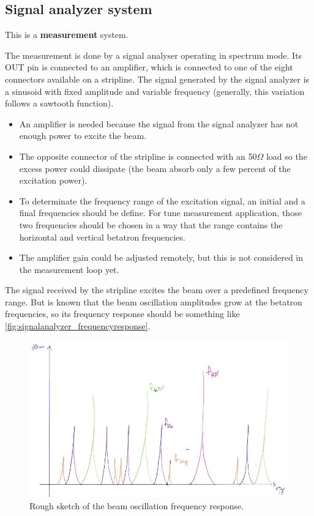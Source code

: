 \subsection{Signal analyzer system}
This is a \textbf{measurement} system.

The measurement is done by a signal analyser operating in spectrum mode. Its OUT pin is connected to an amplifier, which is connected to one of the eight connectors available on a stripline. The signal generated by the signal analyzer is a sinusoid with fixed amplitude and variable frequency (generally, this variation follows a sawtooth function).

\begin{itemize}
	\item An amplifier is needed because the signal from the signal analyzer has not enough power to excite the beam.
	\item The opposite connector of the stripline is connected with an 50$\Omega$ load so the excess power could dissipate (the beam absorb only a few percent of the excitation power).
	\item To determinate the frequency range of the excitation signal, an initial and a final frequencies should be define. For tune measurement application, those two frequencies should be chosen in a way that the range contains the horizontal and vertical betatron frequencies.
	\item The amplifier gain could be adjusted remotely, but this is not considered in the measurement loop yet.
\end{itemize}

The signal received by the stripline excites the beam over a predefined frequency range. But is known that the beam oscillation amplitudes grow at the betatron frequencies, so its frequency response should be something like \autoref{fig:signalanalyzer_frequencyresponse}.

\begin{figure}[!htb]
	\centering
	\includegraphics[width=0.9\linewidth]{./Figures/signalanalyzer_frequencyresponse.png}
	\caption{Rough sketch of the beam oscillation frequency response.}
	\label{fig:signalanalyzer_frequencyresponse}
\end{figure}

